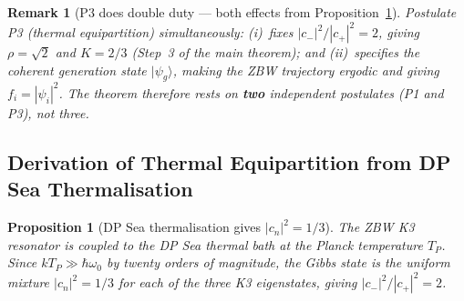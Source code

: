 \documentclass[11pt]{article}
\newtheorem{remark}{Remark}[section]
\newtheorem{proposition}[theorem]{Proposition}
\begin{document}
\begin{remark}[P3 does double duty — both effects from Proposition~\ref{prop:equip_derived}]
Postulate P3 (thermal equipartition) simultaneously: (i)~fixes
$|c_-|^2/|c_+|^2 = 2$, giving $\rho = \sqrt{2}$ and $K = 2/3$
(Step~3 of the main theorem); and (ii)~specifies the coherent generation
state $|\psi_g\rangle$, making the ZBW trajectory ergodic and giving
$f_i = |\psi_i|^2$.  The theorem therefore rests on \textbf{two}
independent postulates (P1 and P3), not three.
\end{remark}


\subsection*{Derivation of Thermal Equipartition from DP Sea Thermalisation}
\label{prop:P3_derivation}

\begin{proposition}[DP Sea thermalisation gives $|c_n|^2 = 1/3$]
\label{prop:equip_derived}
The ZBW K3 resonator is coupled to the DP Sea thermal bath at the
Planck temperature $T_P$.  Since $kT_P \gg \hbar\omega_0$ by twenty orders
of magnitude, the Gibbs state is the uniform mixture $|c_n|^2 = 1/3$
for each of the three K3 eigenstates, giving $|c_-|^2/|c_+|^2 = 2$.
\end{proposition}
\end{document}
